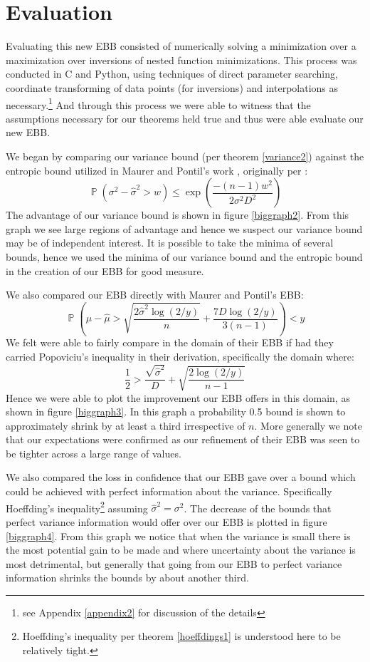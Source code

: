 \documentclass[aap,preprint]{imsart}
\DeclareMathOperator{\p}{\mathbb{P}}
\begin{document}
\section{Evaluation}\label{evaluation}
Evaluating this new EBB consisted of numerically solving a minimization over a maximization over inversions of nested function minimizations.
This process was conducted in C and Python, using techniques of direct parameter searching, coordinate transforming of data points (for inversions) and interpolations as necessary.\footnote{see Appendix \ref{appendix2} for discussion of the details}
And through this process we were able to witness that the assumptions necessary for our theorems held true and thus were able evaluate our new EBB.

We began by comparing our variance bound (per theorem \ref{variance2}) against the entropic bound utilized in Maurer and Pontil's work \cite{Maurer50empiricalbernstein}, originally per \cite{MR2245497}:
\begin{equation}\label{eq:fe} \p(\sigma^2 - \hat{\sigma}^2>w) \le \exp\left(\frac{-(n-1)w^2}{2\sigma^2D^2}\right) \end{equation}
The advantage of our variance bound is shown in figure \ref{biggraph2}.
From this graph we see large regions of advantage and hence we suspect our variance bound may be of independent interest.
It is possible to take the minima of several bounds, hence we used the minima of our variance bound and the entropic bound in the creation of our EBB for good measure.

We also compared our EBB directly with Maurer and Pontil's EBB\cite{Maurer50empiricalbernstein}:
$$ \p\left(\mu-\hat{\mu}>\sqrt{\frac{2\hat{\sigma}^2\log(2/y)}{n}}+\frac{7D\log(2/y)}{3(n-1)}\right)<y $$
We felt were able to fairly compare in the domain of their EBB if had they carried Popoviciu's inequality in their derivation, specifically the domain where:
$$ \frac{1}{2}>\frac{\sqrt{\hat{\sigma}^2}}{D}+\sqrt{\frac{2\log(2/y)}{n-1}} $$
Hence we were able to plot the improvement our EBB offers in this domain, as shown in figure \ref{biggraph3}. In this graph a probability 0.5 bound is shown to approximately shrink by at least a third irrespective of $n$.
More generally we note that our expectations were confirmed as our refinement of their EBB was seen to be tighter across a large range of values.

We also compared the loss in confidence that our EBB gave over a bound which could be achieved with perfect information about the variance. Specifically Hoeffding's inequality\footnote{Hoeffding's inequality per theorem \ref{hoeffdings1} is understood here to be relatively tight.} assuming $\hat{\sigma}^2=\sigma^2$. The decrease of the bounds that perfect variance information would offer over our EBB is plotted in figure \ref{biggraph4}.
From this graph we notice that when the variance is small there is the most potential gain to be made and where uncertainty about the variance is most detrimental, but generally that going from our EBB to perfect variance information shrinks the bounds by about another third.
\end{document}
